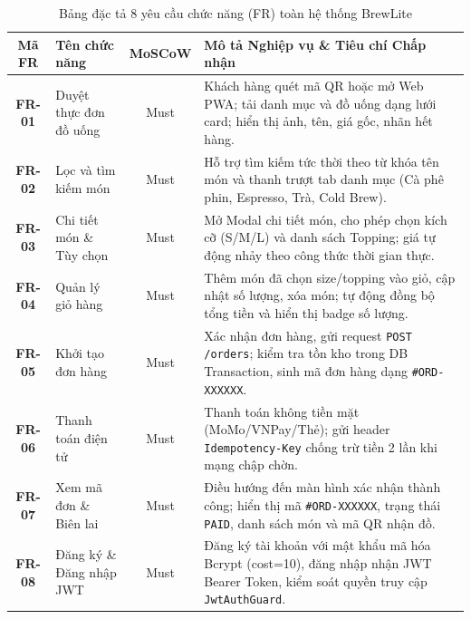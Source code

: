 \documentclass[a4paper]{article}
\begin{document}
\begin{table}[H]
\centering
\small
\begin{tabular}{|c|>{\raggedright\arraybackslash}p{3.4cm}|c|>{\raggedright\arraybackslash}p{7.5cm}|}
\hline
\textbf{Mã FR} & \textbf{Tên chức năng} & \textbf{MoSCoW} & \textbf{Mô tả Nghiệp vụ \& Tiêu chí Chấp nhận} \\ \hline
\textbf{FR-01} & Duyệt thực đơn đồ uống & Must & Khách hàng quét mã QR hoặc mở Web PWA; tải danh mục và đồ uống dạng lưới card; hiển thị ảnh, tên, giá gốc, nhãn hết hàng. \\ \hline
\textbf{FR-02} & Lọc và tìm kiếm món & Must & Hỗ trợ tìm kiếm tức thời theo từ khóa tên món và thanh trượt tab danh mục (Cà phê phin, Espresso, Trà, Cold Brew). \\ \hline
\textbf{FR-03} & Chi tiết món \& Tùy chọn & Must & Mở Modal chi tiết món, cho phép chọn kích cỡ (S/M/L) và danh sách Topping; giá tự động nhảy theo công thức thời gian thực. \\ \hline
\textbf{FR-04} & Quản lý giỏ hàng & Must & Thêm món đã chọn size/topping vào giỏ, cập nhật số lượng, xóa món; tự động đồng bộ tổng tiền và hiển thị badge số lượng. \\ \hline
\textbf{FR-05} & Khởi tạo đơn hàng & Must & Xác nhận đơn hàng, gửi request \texttt{POST /orders}; kiểm tra tồn kho trong DB Transaction, sinh mã đơn hàng dạng \texttt{\#ORD-XXXXXX}. \\ \hline
\textbf{FR-06} & Thanh toán điện tử & Must & Thanh toán không tiền mặt (MoMo/VNPay/Thẻ); gửi header \texttt{Idempotency-Key} chống trừ tiền 2 lần khi mạng chập chờn. \\ \hline
\textbf{FR-07} & Xem mã đơn \& Biên lai & Must & Điều hướng đến màn hình xác nhận thành công; hiển thị mã \texttt{\#ORD-XXXXXX}, trạng thái \texttt{PAID}, danh sách món và mã QR nhận đồ. \\ \hline
\textbf{FR-08} & Đăng ký \& Đăng nhập JWT & Must & Đăng ký tài khoản với mật khẩu mã hóa Bcrypt (cost=10), đăng nhập nhận JWT Bearer Token, kiểm soát quyền truy cập \texttt{JwtAuthGuard}. \\ \hline
\end{tabular}
\caption{Bảng đặc tả 8 yêu cầu chức năng (FR) toàn hệ thống BrewLite}
\label{tab:srs}
\end{table}
\end{document}
